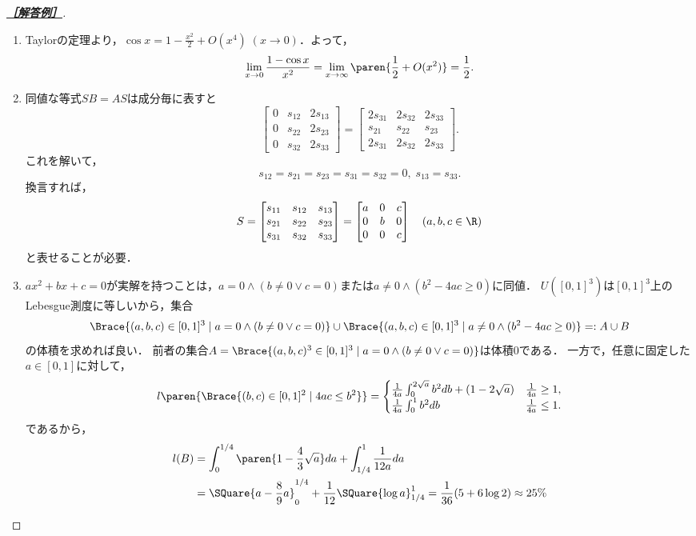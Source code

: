 \documentclass[uplatex,dvipdfmx]{jsarticle}
\begin{document}
\begin{proof}[\textbf{\underline{［解答例］}}]\mbox{}
    \begin{enumerate}
        \item Taylorの定理より，$\cos x=1-\frac{x^2}{2}+O(x^4)\;(x\to0)$．よって，
        \[\lim_{x\to0}\frac{1-\cos x}{x^2}=\lim_{x\to\infty}\paren{\frac{1}{2}+O(x^2)}=\frac{1}{2}.\]
        \item 同値な等式$SB=AS$は成分毎に表すと
        \[\begin{bmatrix}
            0&s_{12}&2s_{13}\\0&s_{22}&2s_{23}\\0&s_{32}&2s_{33}
        \end{bmatrix}=\begin{bmatrix}
            2s_{31}&2s_{32}&2s_{33}\\s_{21}&s_{22}&s_{23}\\2s_{31}&2s_{32}&2s_{33}
        \end{bmatrix}.\]
        これを解いて，
        \[s_{12}=s_{21}=s_{23}=s_{31}=s_{32}=0,\;s_{13}=s_{33}.\]
        換言すれば，
        \[S=\begin{bmatrix}
            s_{11}&s_{12}&s_{13}\\s_{21}&s_{22}&s_{23}\\s_{31}&s_{32}&s_{33}
        \end{bmatrix}=\begin{bmatrix}
            a&0&c\\0&b&0\\0&0&c
        \end{bmatrix}\quad(a,b,c\in\R)\]
        と表せることが必要．
        \item $ax^2+bx+c=0$が実解を持つことは，$a=0\land(b\ne0\lor c=0)$または$a\ne0\land(b^2-4ac\ge0)$に同値．
        $U([0,1]^3)$は$[0,1]^3$上のLebesgue測度に等しいから，集合
        \[\Brace{(a,b,c)\in[0,1]^3\mid a=0\land(b\ne0\lor c=0)}\cup\Brace{(a,b,c)\in[0,1]^3\mid a\ne0\land(b^2-4ac\ge0)}=:A\cup B\]
        の体積を求めれば良い．
        前者の集合$A=\Brace{(a,b,c)^3\in[0,1]^3\mid a=0\land(b\ne0\lor c=0)}$は体積$0$である．
        一方で，任意に固定した$a\in[0,1]$に対して，
        \[l\paren{\Brace{(b,c)\in[0,1]^2\mid 4ac\le b^2}}=\begin{cases}
            \frac{1}{4a}\int^{2\sqrt{a}}_0b^2db+(1-2\sqrt{a})&\frac{1}{4a}\ge1,\\
            \frac{1}{4a}\int^1_0b^2db&\frac{1}{4a}\le1.
        \end{cases}\]
        であるから，
        \begin{align*}
            l(B)&=\int^{1/4}_0\paren{1-\frac{4}{3}\sqrt{a}}da+\int_{1/4}^1\frac{1}{12a}da\\
            &=\SQuare{a-\frac{8}{9}a}^{1/4}_0+\frac{1}{12}\SQuare{\log a}^1_{1/4}=\frac{1}{36}(5+6\log2)\approx 25\%
        \end{align*}
    \end{enumerate}
\end{proof}
\end{document}

